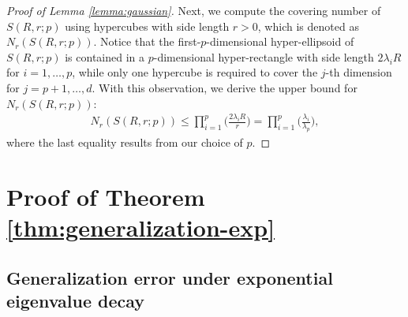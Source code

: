 \begin{proof}[Proof of Lemma \ref{lemma:gaussian}]
    Next, we compute the covering number of $S(R,r;p)$ using hypercubes with side length $r>0$, which is denoted as $N_r(S(R,r;p))$. Notice that the first-$p$-dimensional hyper-ellipsoid of $S(R,r;p)$ is contained in a $p$-dimensional hyper-rectangle with side length $2\lambda_i R$ for $i=1,\ldots,p$, while only one hypercube is required to cover the $j$-th dimension for $j=p+1,\ldots,d$. With this observation,  we derive the upper bound for $N_r(S(R,r;p))$:
    \begin{align*}
        N_r(S(R,r;p)) \leq \prod_{i=1}^p \bigg( \frac{2\lambda_i R}{r}\bigg) 
        = \prod_{i=1}^p \bigg( \frac{\lambda_i}{\lambda_p}\bigg),
    \end{align*} 
    where the last equality results from our choice of $p$.
\end{proof}


\section{Proof of Theorem \ref{thm:generalization-exp}}\label{sec:dim-gaussian}

\subsection{Generalization error under exponential eigenvalue decay}\label{sec:dim-exp}
    
